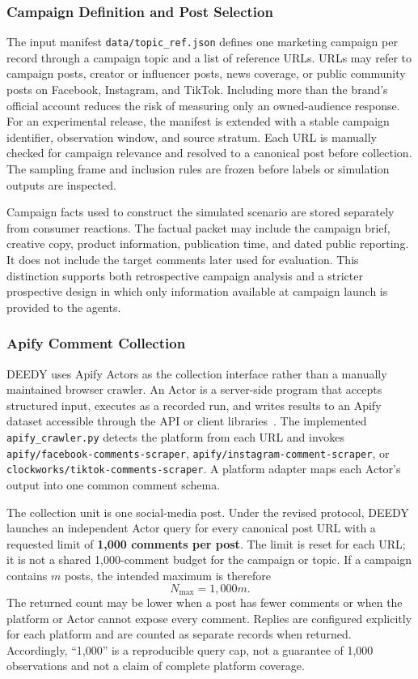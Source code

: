\documentclass[conference]{IEEEtran}
\begin{document}
\subsubsection{Campaign Definition and Post Selection}

The input manifest \texttt{data/topic\_ref.json} defines one marketing campaign
per record through a campaign topic and a list of reference URLs. URLs may
refer to campaign posts, creator or influencer posts, news coverage, or public
community posts on Facebook, Instagram, and TikTok. Including more than the
brand's official account reduces the risk of measuring only an owned-audience
response. For an experimental release, the manifest is extended with a stable
campaign identifier, observation window, and source stratum. Each URL is
manually checked for campaign relevance and resolved to a canonical post before
collection. The sampling frame and inclusion rules are frozen before labels or
simulation outputs are inspected.

Campaign facts used to construct the simulated scenario are stored separately
from consumer reactions. The factual packet may include the campaign brief,
creative copy, product information, publication time, and dated public
reporting. It does not include the target comments later used for evaluation.
This distinction supports both retrospective campaign analysis and a stricter
prospective design in which only information available at campaign launch is
provided to the agents.

\subsubsection{Apify Comment Collection}
\label{sec:apify-collection}

DEEDY uses Apify Actors as the collection interface rather than a manually
maintained browser crawler. An Actor is a server-side program that accepts
structured input, executes as a recorded run, and writes results to an Apify
dataset accessible through the API or client libraries~\cite{apify2026actors}.
The implemented \texttt{apify\_crawler.py} detects the platform from each URL
and invokes \texttt{apify/facebook-comments-scraper},
\texttt{apify/instagram-comment-scraper}, or
\texttt{clockworks/tiktok-comments-scraper}. A platform adapter maps each
Actor's output into one common comment schema.

The collection unit is one social-media post. Under the revised protocol,
DEEDY launches an independent Actor query for every canonical post URL with a
requested limit of
\textbf{1,000 comments per post}. The limit is reset for each URL; it is not a
shared 1,000-comment budget for the campaign or topic. If a campaign contains
$m$ posts, the intended maximum is therefore
\begin{equation}
    N_{\max}=1{,}000m.
\end{equation}
The returned count may be lower when a post has fewer comments or when the
platform or Actor cannot expose every comment. Replies are configured
explicitly for each platform and are counted as separate records when returned.
Accordingly, ``1,000'' is a reproducible query cap, not a guarantee of 1,000
observations and not a claim of complete platform coverage.
\end{document}
